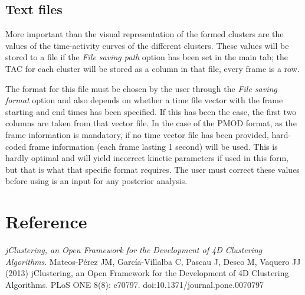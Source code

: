 \documentclass[11pt]{article} %
\begin{document}
\subsection{Text files}
\label{subsec:results_text}

More important than the visual representation of the formed clusters are the values of the time-activity curves of the different
clusters. These values will be stored to a file if the {\em File saving path} option has been set in the main tab; the TAC for
each cluster will be stored as a column in that file, every frame is a row.

The format for this file must be chosen by the user through the {\em File saving format} option and also depends on whether
a time file vector with the frame starting and end times has been specified. If this has been the case, the first two columns
are taken from that vector file. In the case of the PMOD format, as the frame information is mandatory, if no time vector file
has been provided, hard-coded frame information (each frame lasting 1 second) will be used. This is hardly optimal and will yield incorrect kinetic parameters if used in this form, but that is what that specific format requires. The user must correct these values before using is an input for any posterior analysis.

\section{Reference}
\label{sec:reference}

{\em jClustering, an Open Framework for the Development of 4D Clustering Algorithms}. Mateos-Pérez JM, García-Villalba C, Pascau J, Desco M, Vaquero JJ (2013) jClustering, an Open Framework for the Development of 4D Clustering Algorithms. PLoS ONE 8(8): e70797. doi:10.1371/journal.pone.0070797 
\end{document}
